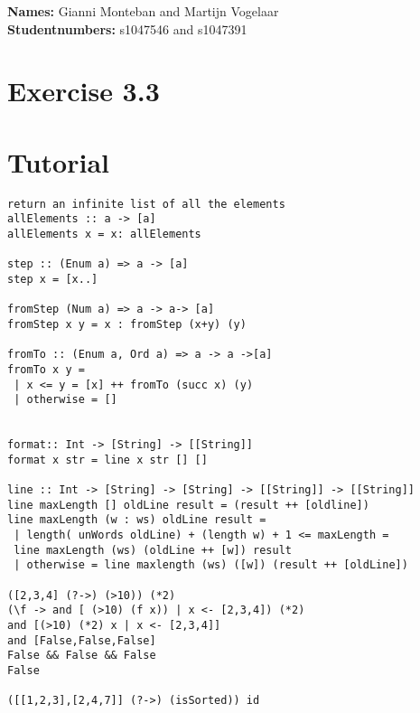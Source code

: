 \documentclass[12pt,a4paper]{report}
\begin{document}
\textbf{Names: } Gianni Monteban and Martijn Vogelaar\\
\textbf{Studentnumbers: } s1047546 and s1047391


\section{Exercise 3.3}


\section{Tutorial}
\begin{verbatim}
return an infinite list of all the elements
allElements :: a -> [a]
allElements x = x: allElements

step :: (Enum a) => a -> [a]
step x = [x..]

fromStep (Num a) => a -> a-> [a]
fromStep x y = x : fromStep (x+y) (y)

fromTo :: (Enum a, Ord a) => a -> a ->[a]
fromTo x y = 
 | x <= y = [x] ++ fromTo (succ x) (y)
 | otherwise = []
 
 
format:: Int -> [String] -> [[String]]
format x str = line x str [] []

line :: Int -> [String] -> [String] -> [[String]] -> [[String]]
line maxLength [] oldLine result = (result ++ [oldline])
line maxLength (w : ws) oldLine result =
 | length( unWords oldLine) + (length w) + 1 <= maxLength = 
 line maxLength (ws) (oldLine ++ [w]) result
 | otherwise = line maxlength (ws) ([w]) (result ++ [oldLine]) 

([2,3,4] (?->) (>10)) (*2)
(\f -> and [ (>10) (f x)) | x <- [2,3,4]) (*2)
and [(>10) (*2) x | x <- [2,3,4]]
and [False,False,False]
False && False && False
False

([[1,2,3],[2,4,7]] (?->) (isSorted)) id
\end{verbatim}
\end{document}
